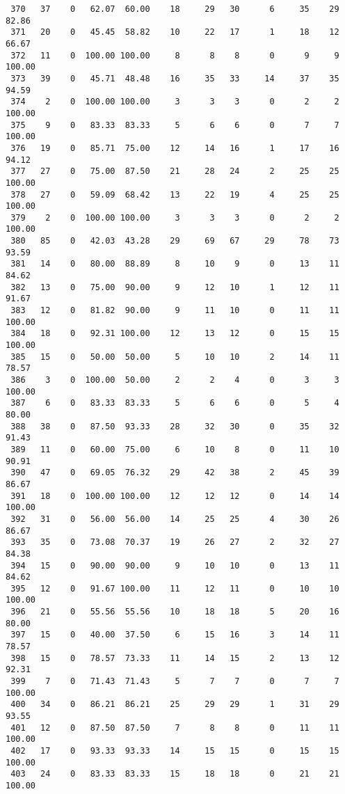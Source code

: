 \begin{verbatim}
 370   37    0   62.07  60.00    18     29   30      6     35    29    82.86
 371   20    0   45.45  58.82    10     22   17      1     18    12    66.67
 372   11    0  100.00 100.00     8      8    8      0      9     9   100.00
 373   39    0   45.71  48.48    16     35   33     14     37    35    94.59
 374    2    0  100.00 100.00     3      3    3      0      2     2   100.00
 375    9    0   83.33  83.33     5      6    6      0      7     7   100.00
 376   19    0   85.71  75.00    12     14   16      1     17    16    94.12
 377   27    0   75.00  87.50    21     28   24      2     25    25   100.00
 378   27    0   59.09  68.42    13     22   19      4     25    25   100.00
 379    2    0  100.00 100.00     3      3    3      0      2     2   100.00
 380   85    0   42.03  43.28    29     69   67     29     78    73    93.59
 381   14    0   80.00  88.89     8     10    9      0     13    11    84.62
 382   13    0   75.00  90.00     9     12   10      1     12    11    91.67
 383   12    0   81.82  90.00     9     11   10      0     11    11   100.00
 384   18    0   92.31 100.00    12     13   12      0     15    15   100.00
 385   15    0   50.00  50.00     5     10   10      2     14    11    78.57
 386    3    0  100.00  50.00     2      2    4      0      3     3   100.00
 387    6    0   83.33  83.33     5      6    6      0      5     4    80.00
 388   38    0   87.50  93.33    28     32   30      0     35    32    91.43
 389   11    0   60.00  75.00     6     10    8      0     11    10    90.91
 390   47    0   69.05  76.32    29     42   38      2     45    39    86.67
 391   18    0  100.00 100.00    12     12   12      0     14    14   100.00
 392   31    0   56.00  56.00    14     25   25      4     30    26    86.67
 393   35    0   73.08  70.37    19     26   27      2     32    27    84.38
 394   15    0   90.00  90.00     9     10   10      0     13    11    84.62
 395   12    0   91.67 100.00    11     12   11      0     10    10   100.00
 396   21    0   55.56  55.56    10     18   18      5     20    16    80.00
 397   15    0   40.00  37.50     6     15   16      3     14    11    78.57
 398   15    0   78.57  73.33    11     14   15      2     13    12    92.31
 399    7    0   71.43  71.43     5      7    7      0      7     7   100.00
 400   34    0   86.21  86.21    25     29   29      1     31    29    93.55
 401   12    0   87.50  87.50     7      8    8      0     11    11   100.00
 402   17    0   93.33  93.33    14     15   15      0     15    15   100.00
 403   24    0   83.33  83.33    15     18   18      0     21    21   100.00

\end{verbatim}

